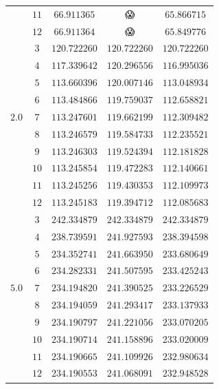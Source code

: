 \documentclass[
    a4paper, aps, twocolumn, floatfix, superscriptaddress,
    nofootinbib]{revtex4-1}
\newcommand{\nan}{{\DejaSans 😱}}
\newcommand{\1}{\mathds{1}}
\begin{document}
\begin{table}
\begin{ruledtabular}
\begin{tabular}{c|c|ccc}
                          & $11$ & $66.911365$ & \nan & $65.866715$ \\
                          & $12$ & $66.911364$ & \nan & $65.849776$ \\
                    \hline
                          & $3$ & $120.722260$ & $120.722260$ & $120.722260$ \\
                          & $4$ & $117.339642$ & $120.296556$ & $116.995036$ \\
                          & $5$ & $113.660396$ & $120.007146$ & $113.048934$ \\
                          & $6$ & $113.484866$ & $119.759037$ & $112.658821$ \\
                    $2.0$ & $7$ & $113.247601$ & $119.662199$ & $112.309482$ \\
                          & $8$ & $113.246579$ & $119.584733$ & $112.235521$ \\
                          & $9$ & $113.246303$ & $119.524394$ & $112.181828$ \\
                          & $10$ & $113.245854$ & $119.472283$ & $112.140661$ \\
                          & $11$ & $113.245256$ & $119.430353$ & $112.109973$ \\
                          & $12$ & $113.245183$ & $119.394712$ & $112.085683$ \\
                    \hline
                          & $3$ & $242.334879$ & $242.334879$ & $242.334879$ \\
                          & $4$ & $238.739591$ & $241.927593$ & $238.394598$ \\
                          & $5$ & $234.352741$ & $241.663950$ & $233.680649$ \\
                          & $6$ & $234.282331$ & $241.507595$ & $233.425243$ \\
                    $5.0$ & $7$ & $234.194820$ & $241.390525$ & $233.226529$ \\
                          & $8$ & $234.194059$ & $241.293417$ & $233.137933$ \\
                          & $9$ & $234.190797$ & $241.221056$ & $233.070205$ \\
                          & $10$ & $234.190714$ & $241.158896$ & $233.020009$ \\
                          & $11$ & $234.190665$ & $241.109926$ & $232.980634$ \\
                          & $12$ & $234.190553$ & $241.068091$ & $232.948528$
                \end{tabular}
            \end{ruledtabular}
            \label{tab:N12}
        \end{table}
\end{document}
